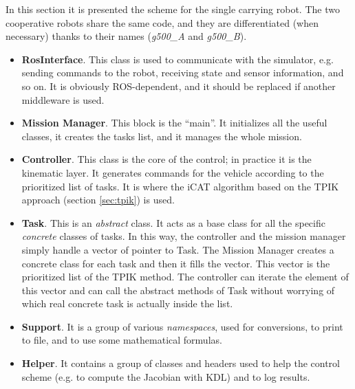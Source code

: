 In this section it is presented the scheme for the single carrying robot. The two cooperative robots share the same code, and they are differentiated (when necessary) thanks to their names (\textit{g500\_A} and \textit{g500\_B}).

\begin{itemize}
	\item \textbf{RosInterface}. This class is used to communicate with the simulator, e.g. sending commands to the robot, receiving state and sensor information, and so on. It is obviously ROS-dependent, and it should be replaced if another middleware is used.
	
	\item \textbf{Mission Manager}. This block is the \enquote{main}. It initializes all the useful classes, it creates the tasks list, and it manages the whole mission.
	
	\item \textbf{Controller}. This class is the core of the control; in practice it is the kinematic layer. It generates commands for the vehicle according to the prioritized list of tasks. It is where the iCAT algorithm based on the TPIK approach (section \ref{sec:tpik}) is used.
	
	\item \textbf{Task}. This is an \textit{abstract} class. It acts as a base class for all the specific \textit{concrete} classes of tasks. In this way, the controller and the mission manager simply handle a vector of pointer to Task. The Mission Manager creates a concrete class for each task and then it fills the vector. This vector is the prioritized list of the TPIK method. The controller can iterate the element of this vector and can call the abstract methods of Task without worrying of which real concrete task is actually inside the list.
	
	\item \textbf{Support}. It is a group of various \textit{namespaces}, used for conversions, to print to file, and to use some mathematical formulas.
	
	\item \textbf{Helper}. It contains a group of classes and headers used to help the control scheme (e.g. to compute the Jacobian with KDL) and to log results.
\end{itemize}


